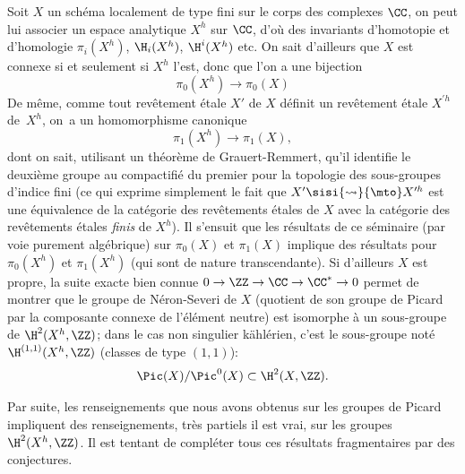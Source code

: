 Soit $X$ un sch\'ema localement de type fini sur le corps des complexes $\CC$, on peut lui associer un espace analytique $X^h$ sur $\CC$, d'o\`u des invariants d'homotopie et d'homologie $\pi_i(X^h)$, $\H_i(X^h)$, $\H^i(X^h)$ etc.  On sait d'ailleurs que $X$ est connexe si et seulement si $X^h$ l'est, donc que l'on a une bijection
$$
\pi_0(X^h)\to \pi_0(X)$$
De m\^eme, comme tout rev\^etement \'etale $X'$ de $X$ d\'efinit un rev\^etement \'etale $X^{\prime h}$ de~$X^h$\pageoriginale, on~a un homomorphisme canonique
$$
\pi_1(X^h)\to \pi_1(X),
$$
dont on sait, utilisant un th\'eor\`eme de Grauert-Remmert, qu'il identifie le deuxi\`eme groupe au compactifi\'e du premier pour la topologie des sous-groupes d'indice fini (ce qui exprime simplement le fait que $X'\sisi{\rightsquigarrow}{\mto} X^{\prime h}$ est une \'equivalence de la cat\'egorie des rev\^etements \'etales de $X$ avec la cat\'egorie des rev\^etements \'etales \emph{finis} de $X^h$). Il s'ensuit que les r\'esultats de ce s\'eminaire (par voie purement alg\'ebrique) sur $\pi_0(X)$ et $\pi_1(X)$ implique des r\'esultats pour $\pi_0(X^h)$ et $\pi_1(X^h)$ (qui sont de nature transcendante). Si d'ailleurs $X$ est propre, la suite exacte bien connue $0\to \ZZ \to \CC\to \CC^*\to 0$ permet de montrer que le groupe de N\'eron-Severi de $X$ (quotient de son groupe de Picard par la composante connexe de l'\'el\'ement neutre) est isomorphe \`a un sous-groupe de $\H^2(X^h, \ZZ)$; dans le cas non singulier k\"ahl\'erien, c'est le sous-groupe not\'e $\H^{(1, 1)}(X^h, \ZZ)$ (classes de type $(1, 1)$):
$$
\Pic(X)/\Pic^0(X)\subset \H^2(X, \ZZ).
$$

Par suite, les renseignements que nous avons obtenus sur les groupes de Picard impliquent des renseignements, tr\`es partiels il est vrai, sur les groupes $\H^2(X^h, \ZZ)$. Il est tentant de compl\'eter tous ces r\'esultats fragmentaires par des conjectures.

